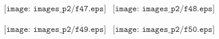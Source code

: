 \documentclass[a4paper,10pt]{article}
\begin{document}
\begin{figure}[h]
\begin{center}$
\begin{array}{cc}
\texttt{[image: images\_p2/f47.eps]} &
\texttt{[image: images\_p2/f48.eps]}
\end{array}$
\end{center}
\end{figure}

\begin{figure}[h]
\begin{center}$
\begin{array}{cc}
\texttt{[image: images\_p2/f49.eps]} &
\texttt{[image: images\_p2/f50.eps]}
\end{array}$
\end{center}
\end{figure}


\end{document}
